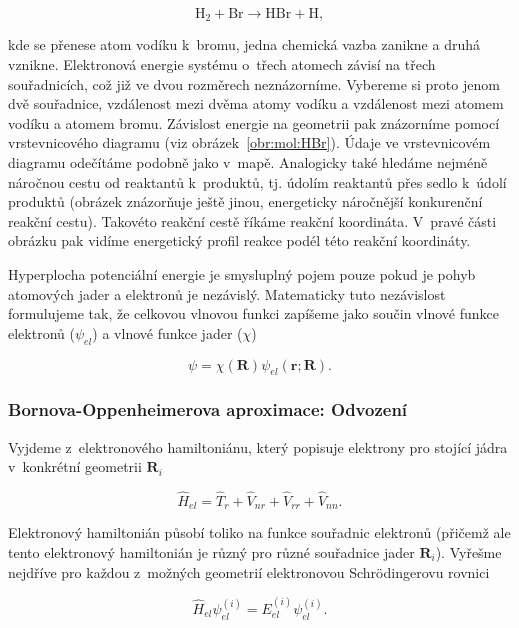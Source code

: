 \begin{equation}
\mathrm{H}_2+\mathrm{Br}\longrightarrow\mathrm{HBr}+\mathrm{H}, 
\end{equation} 

\noindent kde se přenese atom vodíku k~bromu, jedna chemická vazba zanikne a druhá vznikne. Elektronová energie systému o~třech atomech závisí na třech souřadnicích, což již ve dvou rozměrech neznázorníme. Vybereme si proto jenom dvě souřadnice, vzdálenost mezi dvěma atomy vodíku a vzdálenost mezi atomem vodíku a atomem bromu. Závislost energie na geometrii pak znázorníme pomocí vrstevnicového diagramu (viz obrázek~\ref{obr:mol:HBr}). Údaje ve vrstevnicovém diagramu odečítáme podobně jako v~mapě. Analogicky také hledáme nejméně náročnou cestu od reaktantů k~produktů, tj. údolím reaktantů přes sedlo k~údolí produktů (obrázek znázorňuje ještě jinou, energeticky náročnější konkurenční reakční cestu). Takovéto reakční cestě říkáme reakční koordináta. V~pravé části obrázku pak vidíme energetický profil reakce podél této reakční koordináty. 

Hyperplocha potenciální energie je smysluplný pojem pouze pokud je pohyb atomových jader a elektronů je nezávislý. Matematicky tuto nezávislost formulujeme tak, že celkovou vlnovou funkci zapíšeme jako součin vlnové funkce elektronů ($\psi_{el}$) a vlnové funkce jader ($\chi$)

\begin{equation}
\boxed{\psi=\chi(\textbf{R})\psi_{el}(\textbf{r};\textbf{R}).}
\label{rov:mol-BO}
\end{equation}


\subsubsection{Bornova-Oppenheimerova aproximace: Odvození}
Vyjdeme z~elektronového hamiltoniánu, který popisuje elektrony pro stojící jádra v~konkrétní geometrii $\textbf{R}_i$

\begin{displaymath}
\hat{H}_{el}=\hat{T}_r+\hat{V}_{nr}+\hat{V}_{rr}+\hat{V}_{nn}.
\end{displaymath}

\noindent Elektronový hamiltonián působí toliko na funkce souřadnic elektronů (přičemž ale tento elektronový hamiltonián je různý pro různé souřadnice jader $\textbf{R}_i$). Vyřešme nejdříve pro každou z~možných geometrií elektronovou Schrödingerovu rovnici

\begin{equation}
\boxed{\hat{H}_{el}\psi_{el}^{(i)}=E_{el}^{(i)}\psi_{el}^{(i)}.}
\end{equation}

